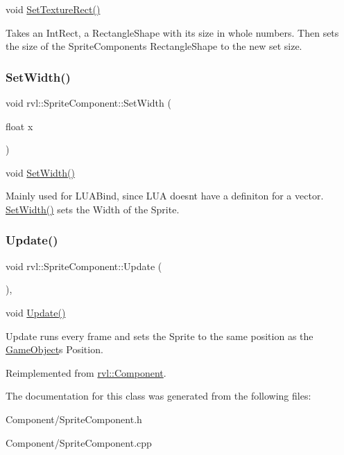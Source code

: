 void \hyperlink{classrvl_1_1_sprite_component_a5d87c00cacc2ed7db9d69cdb15c02505}{Set\+Texture\+Rect()} 

Takes an Int\+Rect, a Rectangle\+Shape with it\textquotesingle{}s size in whole numbers. Then sets the size of the Sprite\+Components Rectangle\+Shape to the new set size. \mbox{\label{classrvl_1_1_sprite_component_a577953a944ed4540f5fb120d0829dc41}} 
\subsubsection{\texorpdfstring{Set\+Width()}{SetWidth()}}
{\footnotesize\ttfamily void rvl\+::\+Sprite\+Component\+::\+Set\+Width (\begin{DoxyParamCaption}\item[{float}]{x }\end{DoxyParamCaption})}



void \hyperlink{classrvl_1_1_sprite_component_a577953a944ed4540f5fb120d0829dc41}{Set\+Width()} 

Mainly used for L\+U\+A\+Bind, since L\+UA doesn\textquotesingle{}t have a definiton for a vector. \hyperlink{classrvl_1_1_sprite_component_a577953a944ed4540f5fb120d0829dc41}{Set\+Width()} sets the Width of the Sprite. \mbox{\label{classrvl_1_1_sprite_component_a819d12d21a21382bba1cda032ebd8eb1}} 
\subsubsection{\texorpdfstring{Update()}{Update()}}
{\footnotesize\ttfamily void rvl\+::\+Sprite\+Component\+::\+Update (\begin{DoxyParamCaption}{ }\end{DoxyParamCaption})\hspace{0.3cm}{\ttfamily [override]}, {\ttfamily [virtual]}}



void \hyperlink{classrvl_1_1_sprite_component_a819d12d21a21382bba1cda032ebd8eb1}{Update()} 

Update runs every frame and sets the Sprite to the same position as the \hyperlink{classrvl_1_1_game_object}{Game\+Object}\textquotesingle{}s Position. 

Reimplemented from \hyperlink{classrvl_1_1_component}{rvl\+::\+Component}.



The documentation for this class was generated from the following files\+:\begin{DoxyCompactItemize}
\item 
Component/Sprite\+Component.\+h\item 
Component/Sprite\+Component.\+cpp\end{DoxyCompactItemize}
